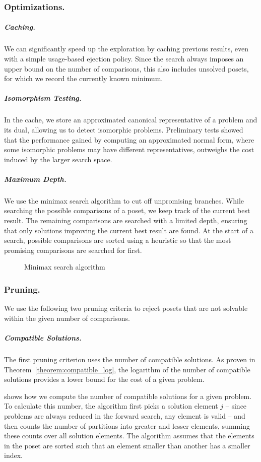 \documentclass[a4paper,UKenglish,cleveref, autoref, thm-restate]{lipics-v2021}
\begin{document}
\subsubsection{Optimizations.}

\subparagraph{Caching.}
We can significantly speed up the exploration by caching previous results, even with a simple usage-based ejection policy.
Since the search always imposes an upper bound on the number of comparisons, this also includes unsolved posets, for which we record the currently known minimum.

\subparagraph{Isomorphism Testing.}
In the cache, we store an approximated canonical representative of a problem and its dual, allowing us to detect isomorphic problems.
Preliminary tests showed that the performance gained by computing an approximated normal form, where some isomorphic problems may have different representatives, outweighs the cost induced by the larger search space.

\subparagraph{Maximum Depth.}
We use the minimax search algorithm to cut off unpromising branches.
While searching the possible comparisons of a poset, we keep track of the current best result.
The remaining comparisons are searched with a limited depth, ensuring that only solutions improving the current best result are found.
At the start of a search, possible comparisons are sorted using a heuristic so that the most promising comparisons are searched for first.

\begin{figure}[!b]
  \centering
  
  \caption{Minimax search algorithm}
  \label{fig:minimax_search}
\end{figure}

\subsubsection{Pruning.}
We use the following two pruning criteria to reject posets that are not solvable within the given number of comparisons.

\subparagraph{Compatible Solutions.}
The first pruning criterion uses the number of compatible solutions.
As proven in Theorem~\ref{theorem:compatible_log}, the logarithm of the number of compatible solutions provides a lower bound for the cost of a given problem.

 shows how we compute the number of compatible solutions for a given problem.
To calculate this number, the algorithm first picks a solution element $j$ -- since problems are always reduced in the forward search, any element is valid -- and then counts the number of partitions into greater and lesser elements, summing these counts over all solution elements.
The algorithm assumes that the elements in the poset are sorted such that an element smaller than another has a smaller index.
\end{document}
